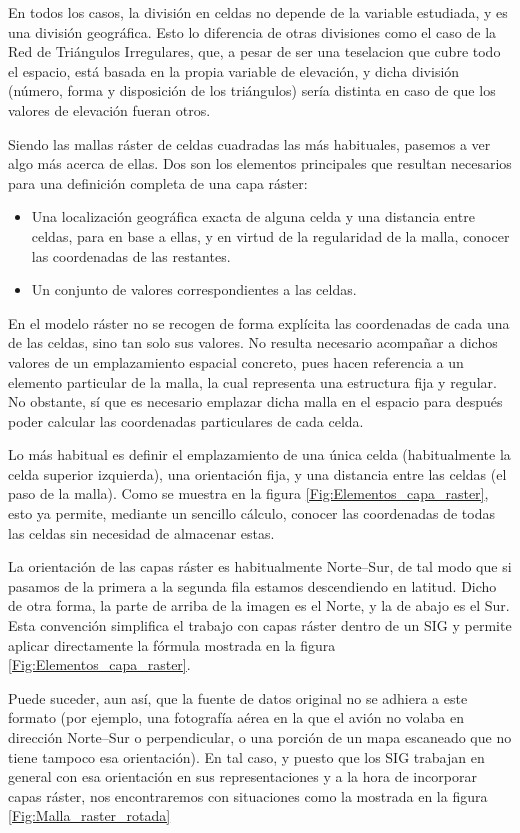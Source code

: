 \begin{multicols}{2}
En todos los casos, la división en celdas no depende de la variable estudiada, y es una división geográfica. Esto lo diferencia de otras divisiones como el caso de la Red de Triángulos Irregulares, que, a pesar de ser una teselacion que cubre todo el espacio, está basada en la propia variable de elevación, y dicha división (número, forma y disposición de los triángulos) sería distinta en caso de que los valores de elevación fueran otros.

Siendo las mallas ráster de celdas cuadradas las más habituales, pasemos a ver algo más acerca de ellas. Dos son los elementos principales que resultan necesarios para una definición completa de una capa ráster:

\begin{itemize}
\item Una localización geográfica exacta de alguna celda y una distancia entre celdas, para en base a ellas, y en virtud de la regularidad de la malla, conocer las coordenadas de las restantes.
\item Un conjunto de valores correspondientes a las celdas.
\end{itemize}

En el modelo ráster no se recogen de forma explícita las coordenadas de cada una de las celdas, sino tan solo sus valores. No resulta necesario acompañar a dichos valores de un emplazamiento espacial concreto, pues hacen referencia a un elemento particular de la malla, la cual representa una estructura fija y regular. No obstante, sí que es necesario emplazar dicha malla en el espacio para después poder calcular las coordenadas particulares de cada celda.

Lo más habitual es definir el emplazamiento de una única celda (habitualmente la celda superior izquierda), una orientación fija, y una distancia entre las celdas (el paso de la malla). Como se muestra en la figura \ref{Fig:Elementos_capa_raster}, esto ya permite, mediante un sencillo cálculo, conocer las coordenadas de todas las celdas sin necesidad de almacenar estas.

La orientación de las capas ráster es habitualmente Norte--Sur, de tal modo que si pasamos de la primera a la segunda fila estamos descendiendo en latitud. Dicho de otra forma, la parte de arriba de la imagen es el Norte, y la de abajo es el Sur. Esta convención simplifica el trabajo con capas ráster dentro de un SIG y permite aplicar directamente la fórmula mostrada en la figura \ref{Fig:Elementos_capa_raster}.

Puede suceder, aun así, que la fuente de datos original no se adhiera a este formato (por ejemplo, una fotografía aérea en la que el avión no volaba en dirección Norte--Sur o perpendicular, o una porción de un mapa escaneado que no tiene tampoco esa orientación). En tal caso, y puesto que los SIG trabajan en general con esa orientación en sus representaciones y a la hora de incorporar capas ráster, nos encontraremos con situaciones como la mostrada en la figura \ref{Fig:Malla_raster_rotada}


\end{multicols}
